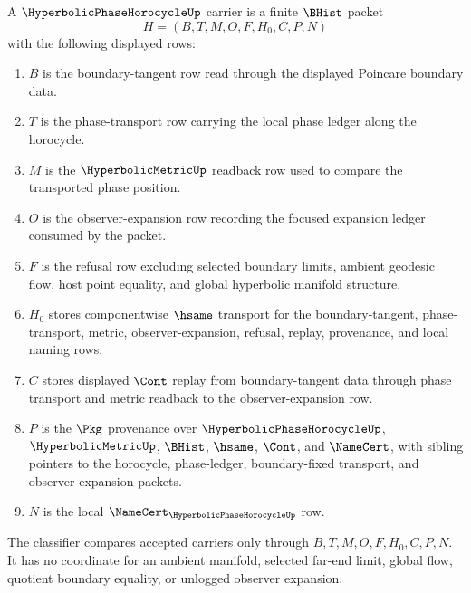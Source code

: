 \begin{definition}
\label{def:hyperbolic-phase-horocycle-carrier}
A $\HyperbolicPhaseHorocycleUp$ carrier is a finite $\BHist$ packet
$$
H=(B,T,M,O,F,H_0,C,P,N)
$$
with the following displayed rows:
\begin{enumerate}
\item $B$ is the boundary-tangent row read through the displayed Poincare boundary data.
\item $T$ is the phase-transport row carrying the local phase ledger along the horocycle.
\item $M$ is the $\HyperbolicMetricUp$ readback row used to compare the transported phase position.
\item $O$ is the observer-expansion row recording the focused expansion ledger consumed by the packet.
\item $F$ is the refusal row excluding selected boundary limits, ambient geodesic flow, host point equality, and global hyperbolic manifold structure.
\item $H_0$ stores componentwise $\hsame$ transport for the boundary-tangent, phase-transport, metric, observer-expansion, refusal, replay, provenance, and local naming rows.
\item $C$ stores displayed $\Cont$ replay from boundary-tangent data through phase transport and metric readback to the observer-expansion row.
\item $P$ is the $\Pkg$ provenance over $\HyperbolicPhaseHorocycleUp$, $\HyperbolicMetricUp$, $\BHist$, $\hsame$, $\Cont$, and $\NameCert$, with sibling pointers to the horocycle, phase-ledger, boundary-fixed transport, and observer-expansion packets.
\item $N$ is the local $\NameCert_{\HyperbolicPhaseHorocycleUp}$ row.
\end{enumerate}
The classifier compares accepted carriers only through $B,T,M,O,F,H_0,C,P,N$. It has no coordinate for an ambient manifold, selected far-end limit, global flow, quotient boundary equality, or unlogged observer expansion.
\end{definition}

